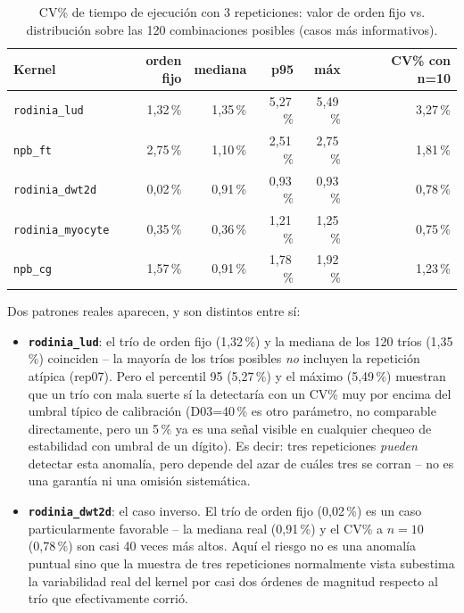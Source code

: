 \begin{table}[H]
\centering
\caption{CV\% de tiempo de ejecución con 3 repeticiones: valor de orden fijo vs. distribución sobre las 120 combinaciones posibles (casos más informativos).}
\label{tab:combinatoric-cv3}
\small
\begin{tabular}{@{}lrrrrr@{}}
\toprule
\textbf{Kernel} & \textbf{orden fijo} & \textbf{mediana} & \textbf{p95} & \textbf{máx} & \textbf{CV\% con n=10} \\
\midrule
\texttt{rodinia\_lud}    & 1{,}32\,\% & 1{,}35\,\% & 5{,}27\,\% & 5{,}49\,\% & 3{,}27\,\% \\
\texttt{npb\_ft}         & 2{,}75\,\% & 1{,}10\,\% & 2{,}51\,\% & 2{,}75\,\% & 1{,}81\,\% \\
\texttt{rodinia\_dwt2d}  & 0{,}02\,\% & 0{,}91\,\% & 0{,}93\,\% & 0{,}93\,\% & 0{,}78\,\% \\
\texttt{rodinia\_myocyte}& 0{,}35\,\% & 0{,}36\,\% & 1{,}21\,\% & 1{,}25\,\% & 0{,}75\,\% \\
\texttt{npb\_cg}         & 1{,}57\,\% & 0{,}91\,\% & 1{,}78\,\% & 1{,}92\,\% & 1{,}23\,\% \\
\bottomrule
\end{tabular}
\end{table}

Dos patrones reales aparecen, y son distintos entre sí:

\begin{itemize}
  \item \textbf{\texttt{rodinia\_lud}}: el trío de orden fijo (1{,}32\,\%) y
    la mediana de los 120 tríos (1{,}35\,\%) coinciden -- la mayoría de los
    tríos posibles \emph{no} incluyen la repetición atípica (rep07). Pero
    el percentil 95 (5{,}27\,\%) y el máximo (5{,}49\,\%) muestran que un
    trío con mala suerte sí la detectaría con un CV\% muy por encima del
    umbral típico de calibración (D03=40\,\% es otro parámetro, no
    comparable directamente, pero un 5\,\% ya es una señal visible en
    cualquier chequeo de estabilidad con umbral de un dígito). Es decir:
    tres repeticiones \emph{pueden} detectar esta anomalía, pero depende
    del azar de cuáles tres se corran -- no es una garantía ni una omisión
    sistemática.
  \item \textbf{\texttt{rodinia\_dwt2d}}: el caso inverso. El trío de orden
    fijo (0{,}02\,\%) es un caso particularmente favorable -- la mediana
    real (0{,}91\,\%) y el CV\% a $n=10$ (0{,}78\,\%) son casi 40 veces
    más altos. Aquí el riesgo no es una anomalía puntual sino que la
    muestra de tres repeticiones normalmente vista subestima la
    variabilidad real del kernel por casi dos órdenes de magnitud respecto
    al trío que efectivamente corrió.
\end{itemize}


